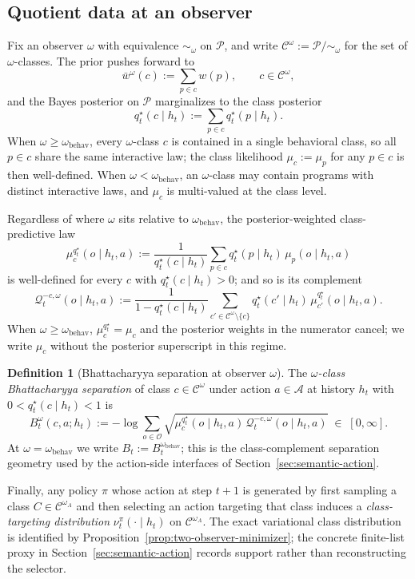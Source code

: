 \documentclass[11pt]{article}
\theoremstyle{definition}
\newtheorem{definition}[theorem]{Definition}
\theoremstyle{remark}
\theoremstyle{plain}
\theoremstyle{definition}
\newcommand{\Acal}{\mathcal{A}}
\newcommand{\Ccal}{\mathcal{C}}
\newcommand{\Ocal}{\mathcal{O}}
\newcommand{\Pcal}{\mathcal{P}}
\newcommand{\Qcal}{\mathcal{Q}}
\begin{document}
\subsection{Quotient data at an observer}
\label{sec:quotient-data}

Fix an observer $\omega$ with equivalence $\sim_\omega$ on $\Pcal$, and write $\Ccal^\omega:=\Pcal/\!\sim_\omega$ for the set of $\omega$-classes. The prior pushes forward to
\[
\bar w^\omega(c):=\sum_{p\in c}w(p),\qquad c\in\Ccal^\omega,
\]
and the Bayes posterior on $\Pcal$ marginalizes to the class posterior
\[
q_t^\star(c\mid h_t):=\sum_{p\in c}q_t^\star(p\mid h_t).
\]
When $\omega\ge\omega_{\mathrm{behav}}$, every $\omega$-class $c$ is contained in a single behavioral class, so all $p\in c$ share the same interactive law; the class likelihood $\mu_c:=\mu_p$ for any $p\in c$ is then well-defined. When $\omega<\omega_{\mathrm{behav}}$, an $\omega$-class may contain programs with distinct interactive laws, and $\mu_c$ is multi-valued at the class level.

Regardless of where $\omega$ sits relative to $\omega_{\mathrm{behav}}$, the posterior-weighted class-predictive law
\[
\mu_c^{q_t^\star}(o\mid h_t,a):=\frac{1}{q_t^\star(c\mid h_t)}\sum_{p\in c}q_t^\star(p\mid h_t)\,\mu_p(o\mid h_t,a)
\]
is well-defined for every $c$ with $q_t^\star(c\mid h_t)>0$; and so is its complement
\[
\Qcal_t^{-c,\omega}(o\mid h_t,a):=\frac{1}{1-q_t^\star(c\mid h_t)}\sum_{c'\in\Ccal^\omega\setminus\{c\}}q_t^\star(c'\mid h_t)\,\mu_{c'}^{q_t^\star}(o\mid h_t,a).
\]
When $\omega\ge\omega_{\mathrm{behav}}$, $\mu_c^{q_t^\star}=\mu_c$ and the posterior weights in the numerator cancel; we write $\mu_c$ without the posterior superscript in this regime.

\begin{definition}[Bhattacharyya separation at observer $\omega$]
\label{def:bhat-omega}
The \emph{$\omega$-class Bhattacharyya separation} of class $c\in\Ccal^\omega$ under action $a\in\Acal$ at history $h_t$ with $0<q_t^\star(c\mid h_t)<1$ is
\[
B_t^\omega(c,a;h_t):=-\log\sum_{o\in\Ocal}\sqrt{\mu_c^{q_t^\star}(o\mid h_t,a)\,\Qcal_t^{-c,\omega}(o\mid h_t,a)}\;\in\;[0,\infty].
\]
At $\omega=\omega_{\mathrm{behav}}$ we write $B_t:=B_t^{\omega_{\mathrm{behav}}}$; this is the class-complement separation geometry used by the action-side interfaces of Section~\ref{sec:semantic-action}.
\end{definition}

Finally, any policy $\pi$ whose action at step $t+1$ is generated by first sampling a class $C\in\Ccal^{\omega_A}$ and then selecting an action targeting that class induces a \emph{class-targeting distribution} $\nu_t^\pi(\cdot\mid h_t)$ on $\Ccal^{\omega_A}$. The exact variational class distribution is identified by Proposition~\ref{prop:two-observer-minimizer}; the concrete finite-list proxy in Section~\ref{sec:semantic-action} records support rather than reconstructing the selector.
\end{document}
